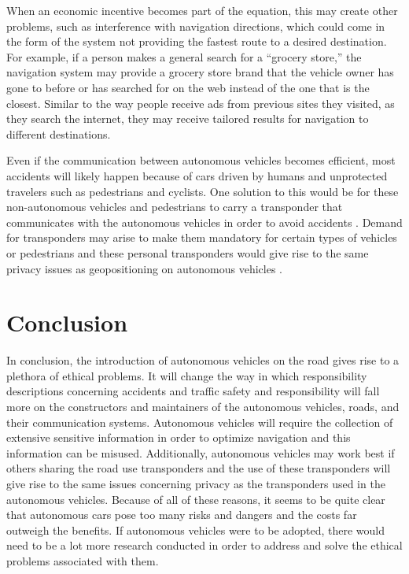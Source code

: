 \documentclass[10pt,twocolumn]{article}
\begin{document}
When an economic incentive becomes part of the equation, this may create other problems, such as interference with navigation directions, which could come in the form of the system not providing the fastest route to a desired destination. For example, if a person makes a general search for a “grocery store,” the navigation system may provide a grocery store brand that the vehicle owner has gone to before or has searched for on the web instead of the one that is the closest. Similar to the way people receive ads from previous sites they visited, as they search the internet, they may receive tailored results for navigation to different destinations.

Even if the communication between autonomous vehicles becomes efficient, most accidents will likely happen because of  cars driven by humans and unprotected travelers such as pedestrians and cyclists. One solution to this would be for these non-autonomous vehicles and pedestrians to carry a transponder that communicates with the autonomous vehicles in order to avoid accidents \cite{EthicalOverview}. Demand for transponders may arise to make them mandatory for certain types of vehicles or pedestrians and these personal transponders would give rise to the same privacy issues as geopositioning on autonomous vehicles \cite{EthicalOverview}.

\section{Conclusion}
In conclusion, the introduction of autonomous vehicles on the road gives rise to a plethora of ethical problems. It will change the way in which responsibility descriptions concerning accidents and traffic safety and responsibility will fall more on the constructors and maintainers of the autonomous vehicles, roads, and their communication systems. Autonomous vehicles will require the collection of extensive sensitive information in order to optimize navigation and this information can be misused. Additionally, autonomous vehicles may work best if others sharing the road use transponders and the use of these transponders will give rise to the same issues concerning privacy as the transponders used in the autonomous vehicles. Because of all of these reasons, it seems to be quite clear that autonomous cars pose too many risks and dangers and the costs far outweigh the benefits. If autonomous vehicles were to be adopted, there would need to be a lot more research conducted in order to address and solve the ethical problems associated with them. 

\printbibliography 
\end{document}
